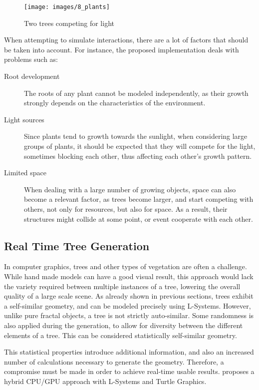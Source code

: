 \documentclass{acmtog}
\begin{document}
\begin{figure}[!htp]
  \begin{center}
    \texttt{[image: images/8\_plants]}
    \caption{Two trees competing for light \label{fig:relations_2}}
    \end{center}
\end{figure}

When attempting to simulate interactions, there are a lot of factors that should be taken into account. For instance, the proposed implementation deals with problems such as:
\begin{description}
  \item[Root development] The roots of any plant cannot be modeled independently, as their growth strongly depends on the characteristics of the environment.
  \item[Light sources] Since plants tend to growth towards the sunlight, when considering large groups of plants, it should be expected that they will compete for the light, sometimes blocking each other, thus affecting each other's growth pattern.
  \item[Limited space] When dealing with a large number of growing objects, space can also become a relevant factor, as trees become larger, and start competing with others, not only for resources, but also for space. As a result, their structures might collide at some point, or event cooperate with each other.
\end{description}

\subsection{Real Time Tree Generation}
\label{subsec:realtimetrees}

In computer graphics, trees and other types of vegetation are often a challenge. While hand made models can have a good visual result, this approach would lack the variety required between multiple instances of a tree, lowering the overall quality of a large scale scene. As already shown in previous sections, trees exhibit a self-similar geometry, and can be modeled precisely using L-Systems.
However, unlike pure fractal objects, a tree is not strictly auto-similar. Some randomness is also applied during the generation, to allow for diversity between the different elements of a tree. This can be considered statistically self-similar geometry.

This statistical properties introduce additional information, and also an increased number of calculations necessary to generate the geometry. Therefore, a compromise must be made in order to achieve real-time usable results. \cite{baele2005real} proposes a hybrid CPU/GPU approach with L-Systems and Turtle Graphics.
\end{document}
